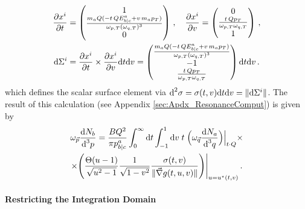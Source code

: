 \begin{gather}
    \frac{\partial x^i}{\partial t}
        =\begin{pmatrix}
            1\\
            \frac{m_aQ(-t\,QE^a_{b\vert c}+v\,m_a p_T)}{\omega_{p,T}(\omega_{q,T})^3}\\
            0
        \end{pmatrix}\,,\quad
    \frac{\partial x^i}{\partial v}=\begin{pmatrix}
        0\\
        \frac{t\,Qp_T}{\omega_{p,T}\omega_{q,T}}\\
        1
    \end{pmatrix}\,,\\
    \text{d}\Sigma^i=\frac{\partial x^i}{\partial t}\times \frac{\partial x^i}{\partial v}\text{d} t\text{d} v=\begin{pmatrix}
        \frac{m_aQ(-t\,QE^a_{b\vert c}+v\,m_a p_T)}{\omega_{p,T}(\omega_{q,T})^3}\\
        -1\\
        \frac{t\,Qp_T}{\omega_{p,T}\omega_{q,T}}
    \end{pmatrix}\text{d} t\text{d} v\,.
\end{gather}
which defines the scalar surface element via $\text{d}^2\sigma=\sigma(t,v)\text{d} t\text{d} v=\Vert\text{d}\Sigma^i\Vert$. The result of this calculation (see Appendix \ref{sec:Apdx_ResonanceComput}) is given by
\begin{multline}
    \omega_{\vec{p}}\frac{\text{d} N_b}{\text{d}^3p}=\frac{BQ^2}{\pi p^a_{b\vert c}}\int_0^\infty\text{d} t\int_{-1}^1\text{d} v\;t\;\Big(\omega_{\vec{q}}\frac{\text{d} N_a}{\text{d}^3 q}\Big)\Big\vert_{t\cdot Q }\times\\
    \times\Bigg(\frac{\Theta(u-1)}{\sqrt{u^2-1}}\frac{1}{\sqrt{1-v^2}}\frac{\sigma(t,v)}{\Vert\vec{\nabla}g(t,u,v)\Vert}\Bigg)\Bigg\vert_{u=u^\star(t,v)}\,.
    \label{eq:DecayCalc_FinalIntegral}
\end{multline}

\paragraph{Restricting the Integration Domain}


